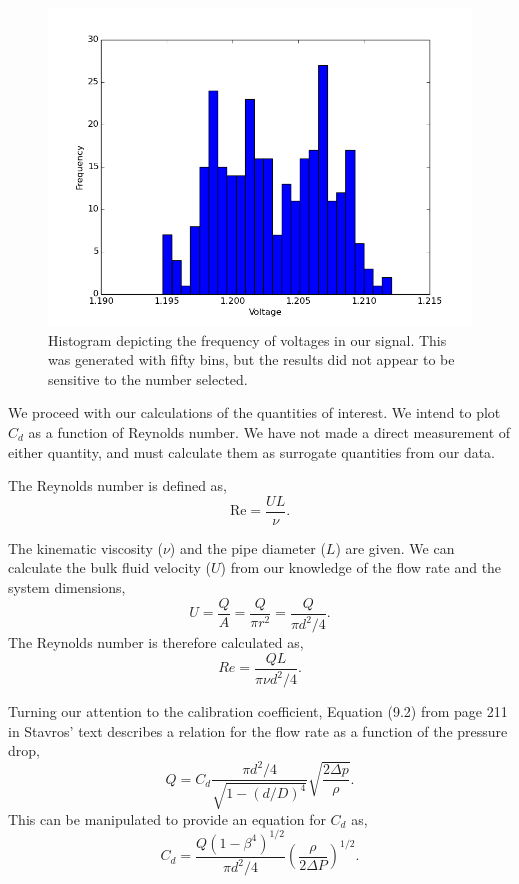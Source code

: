 \documentclass{article}
\begin{document}
  \begin{figure}[!htb]
   \begin{center}
    \includegraphics[width = 12 cm]{figs/oriface_hist.png}
    \caption{Histogram depicting the frequency of voltages in our
    signal. This was generated with fifty bins, but the results did not
    appear to be sensitive to the number selected.}
    \label{oriface-hist}
   \end{center}
  \end{figure}

We proceed with our calculations of the quantities of interest. We
intend to plot $C_d$ as a function of Reynolds number. We have not made
a direct measurement of either quantity, and must calculate them as
surrogate quantities from our data. 

The Reynolds number is defined as, 
\begin{equation}
 \text{Re} = \frac{UL}{\nu}.
\end{equation}

The kinematic viscosity ($\nu$) and the pipe diameter ($L$) are
given. We can calculate the bulk fluid velocity ($U$) from our knowledge
of the flow rate and the system dimensions, 
\begin{equation}
 U = \frac{Q}{A} = \frac{Q}{\pi r^2} = \frac{Q}{\pi d^2/4}.
\end{equation}
The Reynolds number is therefore calculated as,
\begin{equation}
 Re = \frac{Q L}{\pi \nu d^2/4}.
\end{equation}

Turning our attention to the calibration coefficient, Equation (9.2)
from page 211 in Stavros' text describes a relation for  
the flow rate as a function of the pressure drop,  
\begin{equation*}
 Q = C_d \frac{\pi d^2 / 4}{\sqrt{1-(d/D)^4}}\sqrt{\frac{2 \Delta p}{\rho}}.
\end{equation*}
This can be manipulated to provide an equation for $C_d$ as, 
\begin{equation}
 C_d = \frac{Q (1-\beta^4)^{1/2}}{\pi d^2/4} \left(\frac{\rho}{2 \Delta
					      P}\right)^{1/2}.
\end{equation}
\end{document}
